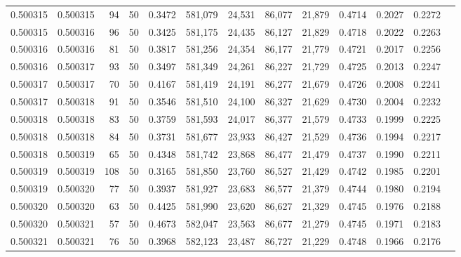 \begin{tabular}{rrrrrrrrrrrrr}
0.500315 & 0.500315 &    94 &  50 &                                     0.3472 & 581,079 &  24,531 &  86,077 &  21,879 & 0.4714 & 0.2027 & 0.2272 \\
0.500315 & 0.500316 &    96 &  50 &                                     0.3425 & 581,175 &  24,435 &  86,127 &  21,829 & 0.4718 & 0.2022 & 0.2263 \\
0.500316 & 0.500316 &    81 &  50 &                                     0.3817 & 581,256 &  24,354 &  86,177 &  21,779 & 0.4721 & 0.2017 & 0.2256 \\
0.500316 & 0.500317 &    93 &  50 &                                     0.3497 & 581,349 &  24,261 &  86,227 &  21,729 & 0.4725 & 0.2013 & 0.2247 \\
0.500317 & 0.500317 &    70 &  50 &                                     0.4167 & 581,419 &  24,191 &  86,277 &  21,679 & 0.4726 & 0.2008 & 0.2241 \\
0.500317 & 0.500318 &    91 &  50 &                                     0.3546 & 581,510 &  24,100 &  86,327 &  21,629 & 0.4730 & 0.2004 & 0.2232 \\
0.500318 & 0.500318 &    83 &  50 &                                     0.3759 & 581,593 &  24,017 &  86,377 &  21,579 & 0.4733 & 0.1999 & 0.2225 \\
0.500318 & 0.500318 &    84 &  50 &                                     0.3731 & 581,677 &  23,933 &  86,427 &  21,529 & 0.4736 & 0.1994 & 0.2217 \\
0.500318 & 0.500319 &    65 &  50 &                                     0.4348 & 581,742 &  23,868 &  86,477 &  21,479 & 0.4737 & 0.1990 & 0.2211 \\
0.500319 & 0.500319 &   108 &  50 &                                     0.3165 & 581,850 &  23,760 &  86,527 &  21,429 & 0.4742 & 0.1985 & 0.2201 \\
0.500319 & 0.500320 &    77 &  50 &                                     0.3937 & 581,927 &  23,683 &  86,577 &  21,379 & 0.4744 & 0.1980 & 0.2194 \\
0.500320 & 0.500320 &    63 &  50 &                                     0.4425 & 581,990 &  23,620 &  86,627 &  21,329 & 0.4745 & 0.1976 & 0.2188 \\
0.500320 & 0.500321 &    57 &  50 &                                     0.4673 & 582,047 &  23,563 &  86,677 &  21,279 & 0.4745 & 0.1971 & 0.2183 \\
0.500321 & 0.500321 &    76 &  50 &                                     0.3968 & 582,123 &  23,487 &  86,727 &  21,229 & 0.4748 & 0.1966 & 0.2176 \\

\end{tabular}
